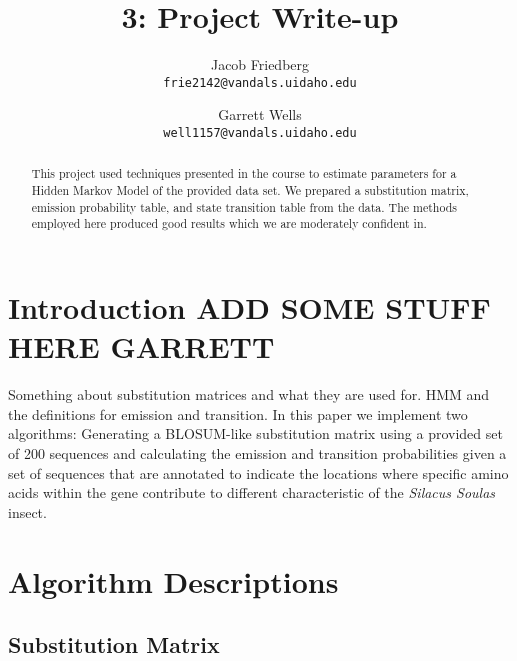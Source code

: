\documentclass[a4paper,11pt]{article}
\title{3: Project Write-up}
\author{
Jacob Friedberg \\
\texttt{frie2142@vandals.uidaho.edu}
\and
Garrett Wells \\
\texttt{well1157@vandals.uidaho.edu}
}
\begin{document}
\maketitle
\begin{abstract}
    \noindent This project used techniques presented in the course to estimate parameters for a Hidden Markov Model of the provided data set. We prepared a substitution matrix, emission probability table, and state transition table from the data. The methods employed here produced good results which we are moderately confident in.
\end{abstract}

\section{Introduction ADD SOME STUFF HERE GARRETT}
Something about substitution matrices and what they are used for. HMM and the definitions for emission and transition. In this paper we implement two algorithms: Generating a BLOSUM-like substitution matrix using a provided set of 200 sequences and calculating the emission and transition probabilities given a set of sequences that are annotated to indicate the locations where specific amino acids within the gene contribute to different characteristic of the \textit{Silacus Soulas} insect.

\section{Algorithm Descriptions}

\subsection{Substitution Matrix}
\end{document}
